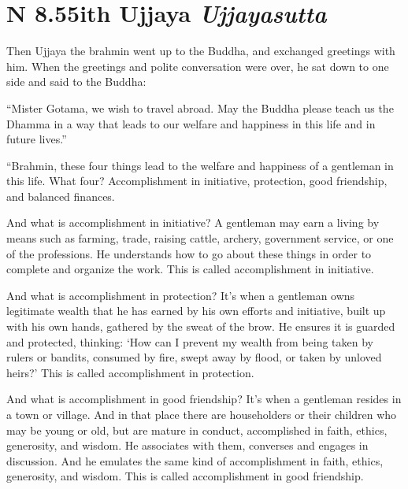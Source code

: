 \documentclass[12pt,openany]{book}%
\newcommand*{\suttatitleacronym}[1]{\smaller[2]{#1}\vspace*{.3em}}
\newcommand*{\suttatitletranslation}[1]{\linebreak{#1}}
\newcommand*{\suttatitleroot}[1]{\linebreak\smaller[2]\itshape{#1}}
\newcommand*{\tocacronym}[1]{\hspace*{-3.3em}{#1}\quad}
\newcommand*{\toctranslation}[1]{#1}
\newcommand*{\tocroot}[1]{(\textit{#1})}
\begin{document}
%
\section*{{\suttatitleacronym AN 8.55}{\suttatitletranslation With Ujjaya }{\suttatitleroot Ujjayasutta}}
\addcontentsline{toc}{section}{\tocacronym{AN 8.55} \toctranslation{With Ujjaya } \tocroot{Ujjayasutta}}

Then Ujjaya the brahmin went up to the Buddha, and exchanged greetings with him. When the greetings and polite conversation were over, he sat down to one side and said to the Buddha: 

“Mister Gotama, we wish to travel abroad. May the Buddha please teach us the Dhamma in a way that leads to our welfare and happiness in this life and in future lives.” 

“Brahmin, these four things lead to the welfare and happiness of a gentleman in this life. What four? Accomplishment in initiative, protection, good friendship, and balanced finances. 

And what is accomplishment in initiative? A gentleman may earn a living by means such as farming, trade, raising cattle, archery, government service, or one of the professions. He understands how to go about these things in order to complete and organize the work. This is called accomplishment in initiative. 

And what is accomplishment in protection? It’s when a gentleman owns legitimate wealth that he has earned by his own efforts and initiative, built up with his own hands, gathered by the sweat of the brow. He ensures it is guarded and protected, thinking: ‘How can I prevent my wealth from being taken by rulers or bandits, consumed by fire, swept away by flood, or taken by unloved heirs?’ This is called accomplishment in protection. 

And what is accomplishment in good friendship? It’s when a gentleman resides in a town or village. And in that place there are householders or their children who may be young or old, but are mature in conduct, accomplished in faith, ethics, generosity, and wisdom. He associates with them, converses and engages in discussion. And he emulates the same kind of accomplishment in faith, ethics, generosity, and wisdom. This is called accomplishment in good friendship. 
\end{document}
